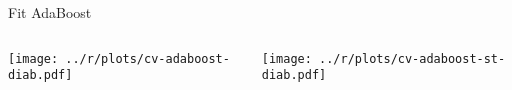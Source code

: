 

\begin{frame}{Fit AdaBoost}




\begin{columns}[T]
\hspace{-2.3em}\begin{column}{0.515\textwidth}
	\texttt{[image: ../r/plots/cv-adaboost-diab.pdf]}
\end{column}
\hspace{-1.3ex}\begin{column}{0.515\textwidth}
	\texttt{[image: ../r/plots/cv-adaboost-st-diab.pdf]}
\end{column}
\end{columns}

\end{frame}


%
%

